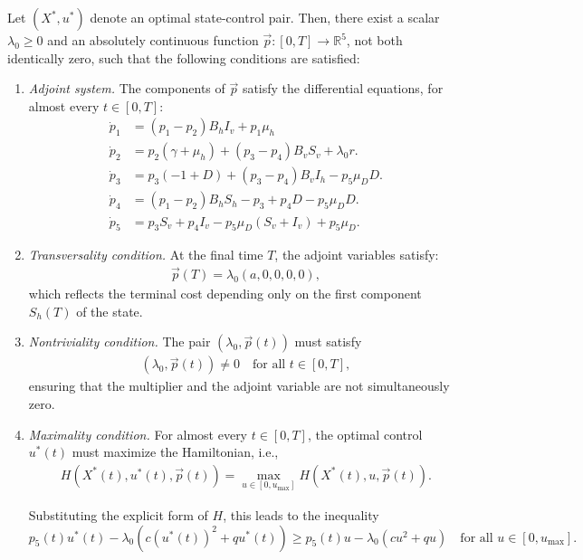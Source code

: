 \documentclass{amsart}
\theoremstyle{definition}
\theoremstyle{remark}
\numberwithin{equation}{section}
\begin{document}
Let $(X^*, u^*)$ denote an optimal state-control pair. Then, there exist a scalar $\lambda_0 \geq 0$ and an absolutely continuous function $\vec{p}:[0,T] \to \mathbb{R}^5$, not both identically zero, such that the following conditions are satisfied:

\begin{enumerate}
	\item \textit{Adjoint system.} The components of $\vec{p}$ satisfy the differential equations, for almost every $t \in [0,T]$:
	\begin{align}\nonumber%
		\dot{p}_1 & =  (p_1-p_2)B_h I_v + p_1\mu_h\\\nonumber
		\dot{p}_2 & =  p_2 (\gamma+\mu_h)  + (p_3-p_4)B_v S_v+\lambda_0 r.\\\label{pode}
		\dot{p}_3 &=  p_3 (-1 + D) + (p_3- p_4)B_v I_h - p_5  \mu_D D.\\\nonumber
		\dot{p}_4 &= (p_1-p_2) B_h S_h -p_3 + p_4   D - p_5\mu_D  D.\\\nonumber
		\dot{p}_5 &  =p_3  S_v + p_4  I_v - p_5\mu_D  (S_v + I_v) +p_5 \mu_D.
	\end{align}

	\item \textit{Transversality condition.} At the final time $T$, the adjoint variables satisfy:
	\begin{align} \label{pfinal}
		\vec{p}(T) = \lambda_0 (a, 0, 0, 0, 0),
	\end{align}
	which reflects the terminal cost depending only on the first component $S_h(T)$ of the state.
	
	\item \textit{Nontriviality condition.} The pair $(\lambda_0, \vec{p}(t))$ must satisfy
	\begin{align} \label{pmp: nontriviality}
		(\lambda_0, \vec{p}(t)) \neq 0 \quad \text{for all } t \in [0,T],
	\end{align}
	ensuring that the multiplier and the adjoint variable are not simultaneously zero.
	
	\item \textit{Maximality condition.} For almost every $t \in [0,T]$, the optimal control $u^*(t)$ must maximize the Hamiltonian, i.e.,
	\begin{align} \label{pmp: max}
		H(X^*(t), u^*(t), \vec{p}(t)) = \max_{u \in [0, u_{\max}]} H(X^*(t), u, \vec{p}(t)).
	\end{align}

	Substituting the explicit form of $H$, this leads to the inequality
	\begin{equation} \label{pmp: optimality}
		p_5(t) u^*(t) - \lambda_0 (c (u^*(t))^2 + q u^*(t)) \ge p_5(t) u - \lambda_0 (c u^2 + q u) \quad \text{for all } u \in [0, u_{\max}].
	\end{equation}
\end{enumerate}
\end{document}
